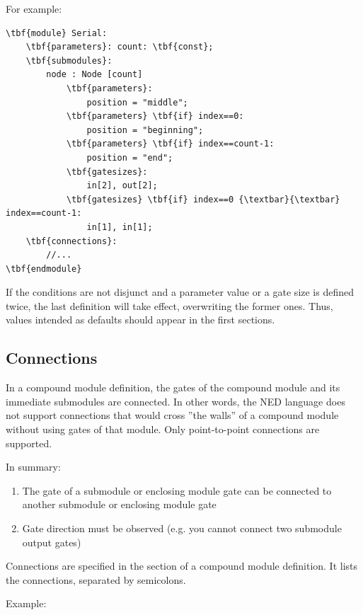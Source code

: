 For example:

\begin{Verbatim}[commandchars=\\\{\}]
\tbf{module} Serial:
    \tbf{parameters}: count: \tbf{const}; 
    \tbf{submodules}: 
        node : Node [count]
            \tbf{parameters}:
                position = "middle";
            \tbf{parameters} \tbf{if} index==0:
                position = "beginning"; 
            \tbf{parameters} \tbf{if} index==count-1: 
                position = "end";
            \tbf{gatesizes}:
                in[2], out[2]; 
            \tbf{gatesizes} \tbf{if} index==0 {\textbar}{\textbar} index==count-1: 
                in[1], in[1];
    \tbf{connections}:
        //...
\tbf{endmodule}
\end{Verbatim}


If the conditions are not disjunct and a parameter value or a 
gate size is defined twice, the last definition will take effect, 
overwriting the former ones. Thus, values intended as defaults 
should appear in the first sections.





\subsection{Connections}



In a compound module definition, the gates of the compound module and
its immediate submodules are connected. In other
words, the NED language does not support connections that would cross
''the walls'' of a compound module without using gates of that module.
Only point-to-point connections are supported.


In summary:
\begin{enumerate}
  \item{The gate of a submodule or enclosing module gate can be connected 
    to another submodule or enclosing module gate}
  \item{Gate direction must be observed (e.g. you cannot connect two 
    submodule output gates)}
\end{enumerate}


Connections are specified in the
 section of a compound
module definition. It lists the connections, separated by semicolons.

Example:


